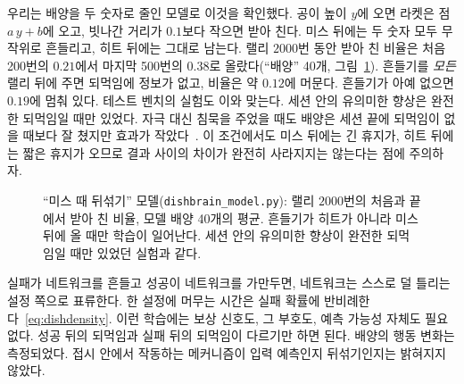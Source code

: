 우리는 배양을 두 숫자로 줄인 모델로 이것을 확인했다. 공이 높이 $y$에 오면 라켓은 점 $a\,y+b$에 오고, 빗나간 거리가 $0.1$보다 작으면 받아 친다. 미스 뒤에는 두 숫자 모두 무작위로 흔들리고, 히트 뒤에는 그대로 남는다. 랠리 $2000$번 동안 받아 친 비율은 처음 200번의 $0.21$에서 마지막 500번의 $0.38$로 올랐다(“배양” 40개, 그림~\ref{fig:dishmodel}). 흔들기를 \emph{모든} 랠리 뒤에 주면 되먹임에 정보가 없고, 비율은 약 $0.12$에 머문다. 흔들기가 아예 없으면 $0.19$에 멈춰 있다. 테스트 벤치의 실험도 이와 맞는다. 세션 안의 유의미한 향상은 완전한 되먹임일 때만 있었다. 자극 대신 침묵을 주었을 때도 배양은 세션 끝에 되먹임이 없을 때보다 잘 쳤지만 효과가 작았다~\cite{Kagan2022}. 이 조건에서도 미스 뒤에는 긴 휴지가, 히트 뒤에는 짧은 휴지가 오므로 결과 사이의 차이가 완전히 사라지지는 않는다는 점에 주의하자.

\begin{figure}[t]
\centering
{}
\caption{“미스 때 뒤섞기” 모델(\texttt{dishbrain\_model.py}): 랠리 $2000$번의 처음과 끝에서 받아 친 비율, 모델 배양 40개의 평균. 흔들기가 히트가 아니라 미스 뒤에 올 때만 학습이 일어난다. 세션 안의 유의미한 향상이 완전한 되먹임일 때만 있었던 실험과 같다.}
\label{fig:dishmodel}
\end{figure}

\begin{keyblock}
\begin{proposition}[뒤섞는 교사]
\label{prop:dishscramble}
실패가 네트워크를 흔들고 성공이 네트워크를 가만두면, 네트워크는 스스로 덜 틀리는 설정 쪽으로 표류한다. 한 설정에 머무는 시간은 실패 확률에 반비례한다~\eqref{eq:dishdensity}. 이런 학습에는 보상 신호도, 그 부호도, 예측 가능성 자체도 필요 없다. 성공 뒤의 되먹임과 실패 뒤의 되먹임이 다르기만 하면 된다. 배양의 행동 변화는 측정되었다. 접시 안에서 작동하는 메커니즘이 입력 예측인지 뒤섞기인지는 밝혀지지 않았다.
\end{proposition}
\end{keyblock}

